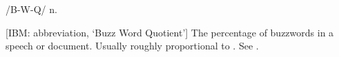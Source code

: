  /B-W-Q/ n.

[IBM: abbreviation, `Buzz Word Quotient'] The percentage of buzzwords in a
speech or document. Usually roughly proportional to
. See .

